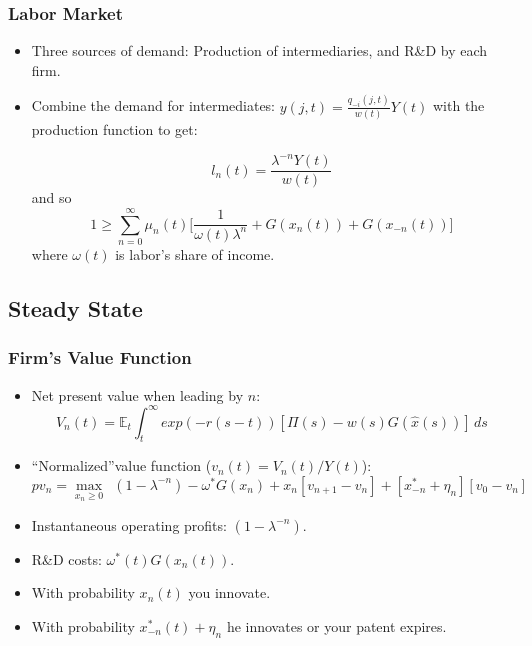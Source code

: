 \documentclass{beamer}
\begin{document}
\begin{frame}[t]\frametitle{Labor Market} 
  \begin{itemize}
    \item<+-> Three sources of demand: Production of intermediaries, and R\&D by each firm.
    \item<+-> Combine the demand for intermediates: $y(j, t) = \frac{q_{-i}(j, t)}{w(t)}Y(t)$ with the production function to get:

      \begin{equation*}
        l_n(t) = \frac{\lambda^{-n}Y(t)}{w(t)}
      \end{equation*}
    and so
      \begin{equation*} \label{eq:labor_clearing}
        1 \geq \sum_{n=0}^{\infty} \mu_n(t) \Big[\frac{1}{\omega(t)\lambda^n} + G(x_n(t))    + G(x_{-n}(t))\Big]
      \end{equation*}
      where $\omega(t)$ is labor's share of income.

  \end{itemize}
\end{frame}
\subsection{Steady State}
\label{sub:steady_state}
\begin{frame}[t]\frametitle{Firm's Value Function} 
  \begin{itemize}
    \item<+-> Net present value when leading by $n$:
      \begin{equation*}
        V_n(t) = \mathbb{E}_t \int_{t}^{\infty} exp(-r(s - t))[\Pi(s) - w(s)G(\hat{x}(s))]\,ds 
      \end{equation*}
    \item<+-> ``Normalized''value function ($v_n(t) = V_n(t) / Y(t)$):
      \begin{equation*} \label{eq:rvf_leader}  %
          pv_n = \max_{x_n \geq 0}\ \ (1 - \lambda^{-n}) - \omega^*G(x_n) + x_n[v_{n+1} - v_n] + [x_{-n}^* + \eta_n][v_0 - v_n]
        \end{equation*}
    \item<+-> Instantaneous operating profits: $(1 - \lambda^{-n})$.
    \item<+-> R\&D costs: $\omega^*(t)G(x_n(t))$.
    \item<+-> With probability $x_n(t)$ you innovate.
    \item<+-> With probability $x_{-n}^*(t) + \eta_n$ he innovates or your patent expires.
  \end{itemize}
\end{frame}
\end{document}
